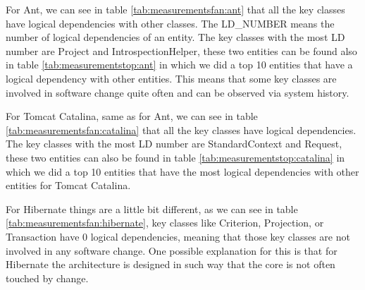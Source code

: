 \documentclass[12pt, a4paper, twoside]{report}
\begin{document}
For Ant, we can see in table \ref{tab:measurementsfan:ant} that all the key classes have logical dependencies with other classes. The LD\_NUMBER means the number of logical dependencies of an entity. The key classes with the most LD number are Project and IntrospectionHelper, these two entities can be found also in table \ref{tab:measurementstop:ant} in which we did a top 10 entities that have a logical dependency with other entities. This means that some key classes are involved in software change quite often and can be observed via system history.

\begin{table}[!h]
\renewcommand{\arraystretch}{1}
\caption{Measurements for Ant key classes}
\label{tab:measurementsfan:ant}
\centering
{}
\end{table}


For Tomcat Catalina, same as for Ant, we can see in table \ref{tab:measurementsfan:catalina} that all the key classes have logical dependencies.  The key classes with the most LD number are StandardContext and Request, these two entities can also be found in table \ref{tab:measurementstop:catalina} in which we did a top 10 entities that have the most logical dependencies with other entities for Tomcat Catalina.

For Hibernate things are a little bit different, as we can see in table \ref{tab:measurementsfan:hibernate},  key classes like Criterion, Projection, or Transaction have 0 logical dependencies, meaning that those key classes are not involved in any software change. One possible explanation for this is that for Hibernate the architecture is designed in such way that the core is not often touched by change. 
\end{document}
